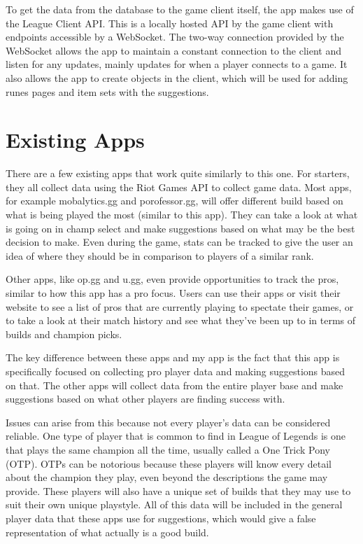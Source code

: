 \documentclass[10pt,twocolumn]{article}
\begin{document}
To get the data from the database to the game client itself, the app makes use of the League Client API.
This is a locally hosted API by the game client with endpoints accessible by a WebSocket.
The two-way connection provided by the WebSocket allows the app to maintain a constant connection to the client and listen for any updates, mainly updates for when a player connects to a game.
It also allows the app to create objects in the client, which will be used for adding runes pages and item sets with the suggestions.

\section{Existing Apps}
There are a few existing apps that work quite similarly to this one.
For starters, they all collect data using the Riot Games API to collect game data.
Most apps, for example mobalytics.gg and porofessor.gg, will offer different build based on what is being played the most (similar to this app).
They can take a look at what is going on in champ select and make suggestions based on what may be the best decision to make.
Even during the game, stats can be tracked to give the user an idea of where they should be in comparison to players of a similar rank.

Other apps, like op.gg and u.gg, even provide opportunities to track the pros, similar to how this app has a pro focus.
Users can use their apps or visit their website to see a list of pros that are currently playing to spectate their games, or to take a look at their match history and see what they've been up to in terms of builds and champion picks.

The key difference between these apps and my app is the fact that this app is specifically focused on collecting pro player data and making suggestions based on that.
The other apps will collect data from the entire player base and make suggestions based on what other players are finding success with.

Issues can arise from this because not every player's data can be considered reliable.
One type of player that is common to find in League of Legends is one that plays the same champion all the time, usually called a One Trick Pony (OTP).
OTPs can be notorious because these players will know every detail about the champion they play, even beyond the descriptions the game may provide.
These players will also have a unique set of builds that they may use to suit their own unique playstyle.
All of this data will be included in the general player data that these apps use for suggestions, which would give a false representation of what actually is a good build.
\end{document}
